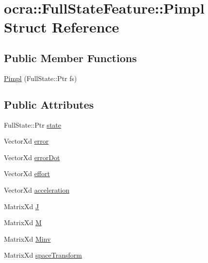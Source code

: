 \hypertarget{structocra_1_1FullStateFeature_1_1Pimpl}{}\section{ocra\+:\+:Full\+State\+Feature\+:\+:Pimpl Struct Reference}
\label{structocra_1_1FullStateFeature_1_1Pimpl}
\subsection*{Public Member Functions}
\begin{DoxyCompactItemize}
\item 
\hyperlink{structocra_1_1FullStateFeature_1_1Pimpl_a535c4bad2a46c4c31f3b6aa052564b16}{Pimpl} (Full\+State\+::\+Ptr fs)
\end{DoxyCompactItemize}
\subsection*{Public Attributes}
\begin{DoxyCompactItemize}
\item 
Full\+State\+::\+Ptr \hyperlink{structocra_1_1FullStateFeature_1_1Pimpl_a4561279776ecf9adda446067000e3536}{state}
\item 
Vector\+Xd \hyperlink{structocra_1_1FullStateFeature_1_1Pimpl_a37accc4269498c113d450b0106115274}{error}
\item 
Vector\+Xd \hyperlink{structocra_1_1FullStateFeature_1_1Pimpl_aea594214dbcf9bd9c7fb28b16593df7e}{error\+Dot}
\item 
Vector\+Xd \hyperlink{structocra_1_1FullStateFeature_1_1Pimpl_a7e2566a7756280de4327e405cab53956}{effort}
\item 
Vector\+Xd \hyperlink{structocra_1_1FullStateFeature_1_1Pimpl_affdd50d872fa8b7fb0da46f5193e3853}{acceleration}
\item 
Matrix\+Xd \hyperlink{structocra_1_1FullStateFeature_1_1Pimpl_aaf69c11e2ad69ab31c1b6614dec068bd}{J}
\item 
Matrix\+Xd \hyperlink{structocra_1_1FullStateFeature_1_1Pimpl_ae2b1ab14e57380beb59d953ab4e72045}{M}
\item 
Matrix\+Xd \hyperlink{structocra_1_1FullStateFeature_1_1Pimpl_add9febc56f82bdd70913af436e2a32ef}{Minv}
\item 
Matrix\+Xd \hyperlink{structocra_1_1FullStateFeature_1_1Pimpl_a365838ffac9d0f8710c86493f04aa084}{space\+Transform}
\end{DoxyCompactItemize}


